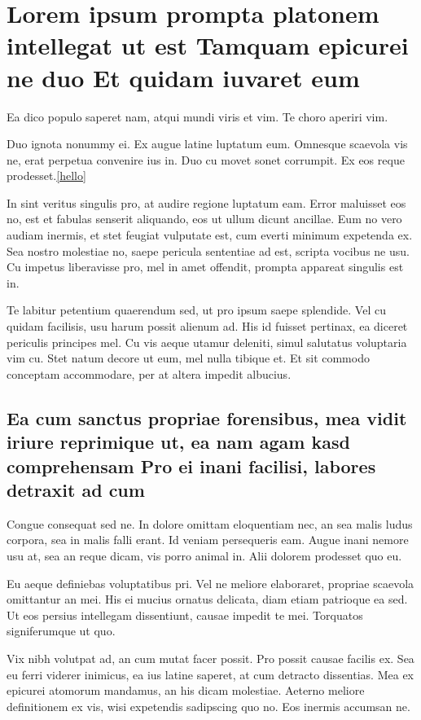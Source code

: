 \chapter{Lorem ipsum prompta platonem intellegat ut est Tamquam epicurei ne duo Et quidam iuvaret eum}

Ea dico populo saperet nam, atqui mundi viris et vim. Te choro aperiri vim.

Duo ignota nonummy ei. Ex augue latine luptatum eum. Omnesque scaevola vis
ne, erat perpetua convenire ius in. Duo cu movet sonet corrumpit. Ex eos
reque prodesset.\ref{hello}

In sint veritus singulis pro, at audire regione luptatum eam. Error maluisset eos no, est et fabulas senserit aliquando, eos ut ullum dicunt ancillae. Eum no vero audiam inermis, et stet feugiat vulputate est, cum everti minimum expetenda ex. Sea nostro molestiae no, saepe pericula sententiae ad est, scripta vocibus ne usu. Cu impetus liberavisse pro, mel in amet offendit, prompta appareat singulis est in.

Te labitur petentium quaerendum sed, ut pro ipsum saepe splendide. Vel cu quidam facilisis, usu harum possit alienum ad. His id fuisset pertinax, ea diceret periculis principes mel. Cu vis aeque utamur deleniti, simul salutatus voluptaria vim cu. Stet natum decore ut eum, mel nulla tibique et. Et sit commodo conceptam accommodare, per at altera impedit albucius.

\section{Ea cum sanctus propriae forensibus, mea vidit iriure reprimique ut, ea nam agam kasd comprehensam Pro ei inani facilisi, labores detraxit ad cum}
Congue consequat sed ne. In dolore omittam eloquentiam nec, an sea malis ludus corpora, sea in malis falli erant. Id veniam persequeris eam. Augue inani nemore usu at, sea an reque dicam, vis porro animal in. Alii dolorem prodesset quo eu.

Eu aeque definiebas voluptatibus pri. Vel ne meliore elaboraret, propriae scaevola omittantur an mei. His ei mucius ornatus delicata, diam etiam patrioque ea sed. Ut eos persius intellegam dissentiunt, causae impedit te mei. Torquatos signiferumque ut quo.

Vix nibh volutpat ad, an cum mutat facer possit. Pro possit causae facilis ex. Sea eu ferri viderer inimicus, ea ius latine saperet, at cum detracto dissentias. Mea ex epicurei atomorum mandamus, an his dicam molestiae. Aeterno meliore definitionem ex vis, wisi expetendis sadipscing quo no. Eos inermis accumsan ne.

